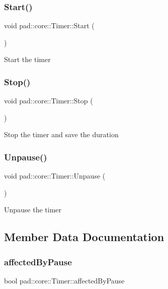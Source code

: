 \subsubsection{\texorpdfstring{Start()}{Start()}}
{\footnotesize\ttfamily void pad\+::core\+::\+Timer\+::\+Start (\begin{DoxyParamCaption}{ }\end{DoxyParamCaption})}

Start the timer \mbox{\label{classpad_1_1core_1_1_timer_a3a3cbda30033c7c9303f34ed103d70d8}} 
\subsubsection{\texorpdfstring{Stop()}{Stop()}}
{\footnotesize\ttfamily void pad\+::core\+::\+Timer\+::\+Stop (\begin{DoxyParamCaption}{ }\end{DoxyParamCaption})}

Stop the timer and save the duration \mbox{\label{classpad_1_1core_1_1_timer_a06994d900c4a882acffc4ba47b99fc85}} 
\subsubsection{\texorpdfstring{Unpause()}{Unpause()}}
{\footnotesize\ttfamily void pad\+::core\+::\+Timer\+::\+Unpause (\begin{DoxyParamCaption}{ }\end{DoxyParamCaption})}

Unpause the timer 

\subsection{Member Data Documentation}
\mbox{\label{classpad_1_1core_1_1_timer_aaf3934066247c812ced8f0b234280925}} 
\subsubsection{\texorpdfstring{affected\+By\+Pause}{affectedByPause}}
{\footnotesize\ttfamily bool pad\+::core\+::\+Timer\+::affected\+By\+Pause\hspace{0.3cm}{\ttfamily [private]}}

